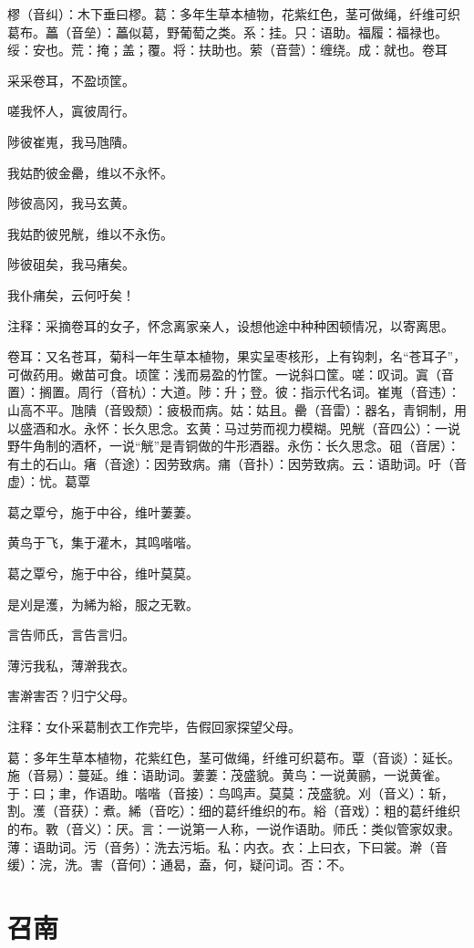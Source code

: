 \documentclass[12pt,UTF8]{ctexbook}
\begin{document}
樛（音纠）：木下垂曰樛。葛：多年生草本植物，花紫红色，茎可做绳，纤维可织葛布。藟（音垒）：藟似葛，野葡萄之类。系：挂。只：语助。福履：福禄也。绥：安也。荒：掩；盖；覆。将：扶助也。萦（音营）：缠绕。成：就也。卷耳

采采卷耳，不盈顷筐。

嗟我怀人，寘彼周行。

陟彼崔嵬，我马虺隤。

我姑酌彼金罍，维以不永怀。

陟彼高冈，我马玄黄。

我姑酌彼兕觥，维以不永伤。

陟彼砠矣，我马瘏矣。

我仆痡矣，云何吁矣！

注释：采摘卷耳的女子，怀念离家亲人，设想他途中种种困顿情况，以寄离思。

卷耳：又名苍耳，菊科一年生草本植物，果实呈枣核形，上有钩刺，名“苍耳子”，可做药用。嫩苗可食。顷筐：浅而易盈的竹筐。一说斜口筐。嗟：叹词。寘（音置）：搁置。周行（音杭）：大道。陟：升；登。彼：指示代名词。崔嵬（音违）：山高不平。虺隤（音毁颓）：疲极而病。姑：姑且。罍（音雷）：器名，青铜制，用以盛酒和水。永怀：长久思念。玄黄：马过劳而视力模糊。兕觥（音四公）：一说野牛角制的酒杯，一说“觥”是青铜做的牛形酒器。永伤：长久思念。砠（音居）：有土的石山。瘏（音途）：因劳致病。痡（音扑）：因劳致病。云：语助词。吁（音虚）：忧。葛覃

葛之覃兮，施于中谷，维叶萋萋。

黄鸟于飞，集于灌木，其鸣喈喈。

葛之覃兮，施于中谷，维叶莫莫。

是刈是濩，为絺为綌，服之无斁。

言告师氏，言告言归。

薄污我私，薄澣我衣。

害澣害否？归宁父母。

注释：女仆采葛制衣工作完毕，告假回家探望父母。

葛：多年生草本植物，花紫红色，茎可做绳，纤维可织葛布。覃（音谈）：延长。施（音易）：蔓延。维：语助词。萋萋：茂盛貌。黄鸟：一说黄鹂，一说黄雀。于：曰；聿，作语助。喈喈（音接）：鸟鸣声。莫莫：茂盛貌。刈（音义）：斩，割。濩（音获）：煮。絺（音吃）：细的葛纤维织的布。綌（音戏）：粗的葛纤维织的布。斁（音义）：厌。言：一说第一人称，一说作语助。师氏：类似管家奴隶。薄：语助词。污（音务）：洗去污垢。私：内衣。衣：上曰衣，下曰裳。澣（音缓）：浣，洗。害（音何）：通曷，盍，何，疑问词。否：不。




\part{召南}
\end{document}
